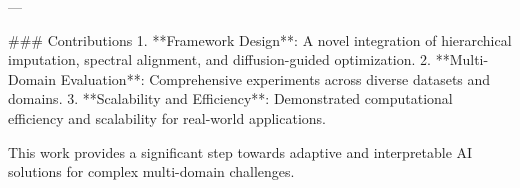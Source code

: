 ---

### Contributions  
1. **Framework Design**: A novel integration of hierarchical imputation, spectral alignment, and diffusion-guided optimization.  
2. **Multi-Domain Evaluation**: Comprehensive experiments across diverse datasets and domains.  
3. **Scalability and Efficiency**: Demonstrated computational efficiency and scalability for real-world applications.  

This work provides a significant step towards adaptive and interpretable AI solutions for complex multi-domain challenges.